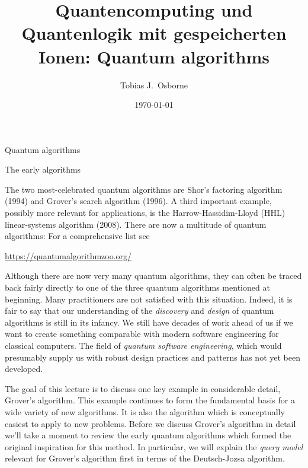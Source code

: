 \documentclass[12pt,oneside]{amsart}
\title[Quantencomputing und Quantenlogik mit gespeicherten Ionen]{Quantencomputing und Quantenlogik mit gespeicherten Ionen: Quantum algorithms}
\author{Tobias J.\ Osborne}
\date{\today}                                           %
\makeatletter
\def\section{\@startsection{section}{1}%
  \z@{.7\linespacing\@plus\linespacing}{.5\linespacing}%
  {\color{cgblue}\normalfont\sf\bfseries\large\centering}}
\def\subsection{\@startsection{subsection}{2}%
  \z@{.5\linespacing\@plus.7\linespacing}{-.5em}%
  {\color{cgblue}\normalfont\sf\bfseries}}
\theoremstyle{plain}%
\theoremstyle{definition}
\theoremstyle{remark}
\makeatother
\begin{document}
\maketitle

\section{Quantum algorithms}

\subsection{The early algorithms}

The two most-celebrated quantum algorithms are Shor's factoring algorithm (1994) and Grover's search algorithm (1996). A third important example, possibly more relevant for applications, is the Harrow-Hassidim-Lloyd (HHL) linear-systems algorithm (2008). There are now a multitude of quantum algorithms: For a comprehensive list see 
\begin{center}
\parbox[c][5cm][c]{14cm}{\begin{tcolorbox}[colback=banana,arc=0cm,frame hidden,enhanced]\url{https://quantumalgorithmzoo.org/}\end{tcolorbox}}
\end{center}
Although there are now very many quantum algorithms, they can often be traced back fairly directly to one of the three quantum algorithms mentioned at beginning. Many practitioners are not satisfied with this situation. Indeed, it is fair to say that our understanding of the \emph{discovery} and \emph{design} of quantum algorithms is still in its infancy. We still have decades of work ahead of us if we want to create something comparable with modern software engineering for classical computers. The field of \emph{quantum software engineering}, which would presumably supply us with robust design practices and patterns has not yet been developed. 

The goal of this lecture is to discuss one key example in considerable detail, Grover's algorithm. This example continues to form the fundamental basis for a wide variety of new algorithms. It is also the algorithm which is conceptually easiest to apply to new problems. Before we discuss Grover's algorithm in detail we'll take a moment to review the early quantum algorithms which formed the original inspiration for this method. In particular, we will explain the \emph{query model} relevant for Grover's algorithm first in terms of the Deutsch-Jozsa algorithm. 
\end{document}
